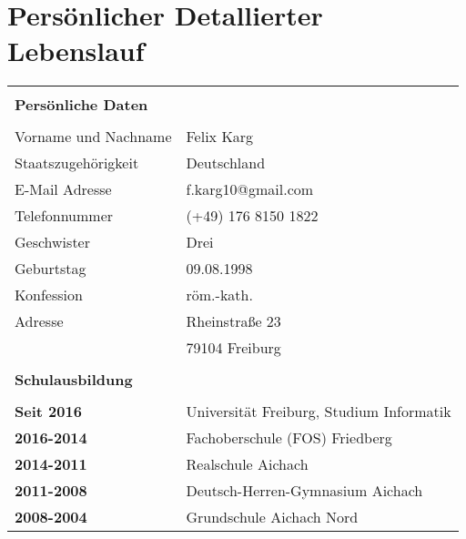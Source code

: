 \documentclass{scrartcl}
\begin{document}
\section*{Persönlicher Detallierter Lebenslauf}


\bigskip
\bigskip

\begin{tabular}{|l|l|}
    \multicolumn{2}{l}{} \\
    \multicolumn{2}{l}{\LARGE \textbf{Persönliche Daten}} \\
    \multicolumn{2}{l}{} \\ \hline
    Vorname und Nachname & Felix Karg \\ \hline
    Staatszugehörigkeit & Deutschland \\ \hline
    E-Mail Adresse & f.karg10@gmail.com \\ \hline
    Telefonnummer & (+49) 176 8150 1822 \\ \hline
    Geschwister & Drei \\ \hline
    Geburtstag & 09.08.1998 \\ \hline
    Konfession & röm.-kath. \\ \hline
    Adresse & Rheinstraße 23 \\
            & 79104 Freiburg \\ \hline
%

    \multicolumn{2}{l}{} \\
    \multicolumn{2}{l}{\LARGE \textbf{Schulausbildung}} \\
    \multicolumn{2}{l}{} \\ \hline

    \textbf{Seit 2016} & Universität Freiburg, Studium Informatik \\ \hline
    \textbf{2016-2014} & Fachoberschule (FOS) Friedberg \\ \hline
    \textbf{2014-2011} & Realschule Aichach \\ \hline
    \textbf{2011-2008} & Deutsch-Herren-Gymnasium Aichach \\ \hline
    \textbf{2008-2004} & Grundschule Aichach Nord \\ \hline
%


\end{tabular}
\end{document}
